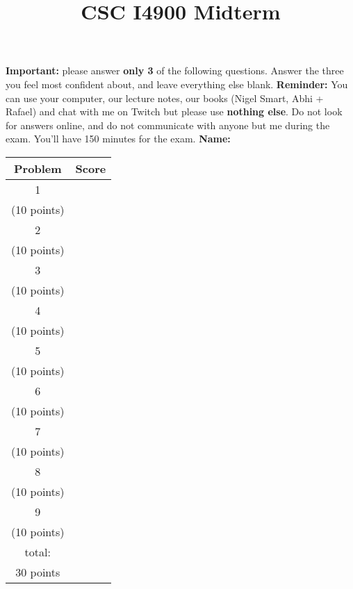 \documentclass[12pt]{article}
\begin{document}
\title{CSC I4900 Midterm}
\date{}

\maketitle
\noindent
\textbf{Important:} please answer \textbf{only 3} of the following questions.
Answer the three you feel most confident about, and leave everything else
blank.  \textbf{Reminder:} You can use your computer, our lecture notes, our
books (Nigel Smart, Abhi + Rafael) and chat with me on Twitch but please use
\textbf{nothing else}.  Do not look for answers online, and do not communicate
with anyone but me during the exam.  You'll have 150 minutes for the exam.
\newline \newline \newline
\textbf{Name: }\hrulefill
\newline\newline

\begin{center}
\begin{tabular}{|c|c|}
  \hline
  Problem & Score \\
  \hline
  1 &
  \\
  (10 points)& \\
  \hline
  2 &  \\
  (10 points)& \\
  \hline
  3 &    \\
  (10 points)& \\
  \hline
  4 &    \\
  (10 points) & \\
  \hline
  5 &    \\
  (10 points)& \\
  \hline
  6 &    \\
  (10 points)& \\
  \hline
  7 &    \\
  (10 points)& \\
  \hline
  8 &    \\
  (10 points)& \\
  \hline
  9 &    \\
  (10 points)& \\
  \hline
  total: &  \\
  30 points& \\
  \hline
\end{tabular}
\end{center}


\newpage
\end{document}
